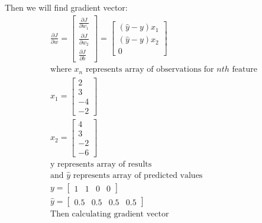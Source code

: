 \documentclass{article}
\begin{document}
Then we will find gradient vector:
\begin{equation}
     \begin{gathered}
            \frac{\partial J}{\partial w} = 
            \begin{bmatrix}
                \frac{\partial J}{\partial w_1} \\[6pt]
                \frac{\partial J}{\partial w_2} \\[6pt]
                \frac{\partial J}{\partial b} 
            \end{bmatrix}
            =
            \begin{bmatrix}
                (\hat{y}-y)x_1  \\[6pt]
                (\hat{y}-y)x_2 \\[6pt]
                0
            \end{bmatrix}
            \\
            \text{where $x_n$ represents array of observations for $nth$ feature} \\
            x_1 =   \begin{bmatrix}
                    2 \\  3  \\ -4  \\ -2            
                    \end{bmatrix}
            \\
            x_2 =   \begin{bmatrix}
                    4  \\  3  \\ -2  \\ -6            
                    \end{bmatrix}
            \\
            \text{y represents array of results}\\
            \text{and $\hat{y}$ represents array of predicted values}\\
            y =     \begin{bmatrix}
                     1 &  1 & 0 & 0            
                    \end{bmatrix}
            \\
            \hat{y} =   \begin{bmatrix}
                        0.5 &  0.5 & 0.5 & 0.5            
                        \end{bmatrix}
            \\
            \text{Then calculating gradient vector}\\

\end{gathered}
\end{equation}
\end{document}
